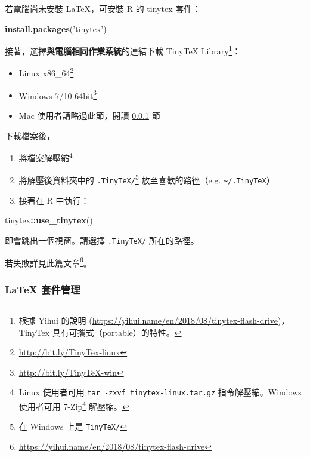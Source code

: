 \documentclass[oneside]{book}
\newenvironment{Shaded}{\begin{snugshade}}{\end{snugshade}}
\newcommand{\KeywordTok}[1]{\textcolor[rgb]{0.13,0.29,0.53}{\textbf{#1}}}
\newcommand{\NormalTok}[1]{#1}
\newcommand{\OperatorTok}[1]{\textcolor[rgb]{0.81,0.36,0.00}{\textbf{#1}}}
\newcommand{\StringTok}[1]{\textcolor[rgb]{0.31,0.60,0.02}{#1}}
\renewcommand{\href}[2]{#2\footnote{\url{#1}}}
\providecommand{\tightlist}{%
  \setlength{\itemsep}{0pt}\setlength{\parskip}{0pt}}
\theoremstyle{definition}
\theoremstyle{definition}
\theoremstyle{definition}
\theoremstyle{remark}
\begin{document}
若電腦尚未安裝 LaTeX，可安裝 R 的 tinytex 套件：

\begin{Shaded}
\begin{Highlighting}[]
\KeywordTok{install.packages}\NormalTok{(}\StringTok{'tinytex'}\NormalTok{)}
\end{Highlighting}
\end{Shaded}

接著，選擇\textbf{與電腦相同作業系統}的連結下載 TinyTeX Library\footnote{根據 Yihui 的說明 (\url{https://yihui.name/en/2018/08/tinytex-flash-drive})，TinyTex 具有可攜式（portable）的特性。}：

\begin{itemize}
\tightlist
\item
  \href{http://bit.ly/TinyTex-linux}{Linux x86\_64}
\item
  \href{http://bit.ly/TinyTeX-win}{Windows 7/10 64bit}
\item
  Mac 使用者請略過此節，閱讀 \ref{tinytex-manage} 節
\end{itemize}

下載檔案後，

\begin{enumerate}
\def\labelenumi{\alph{enumi})}
\item
  將檔案解壓縮\footnote{Linux 使用者可用 \texttt{tar\ -zxvf\ tinytex-linux.tar.gz} 指令解壓縮。Windows 使用者可用 \href{https://www.developershome.com/7-zip/}{7-Zip} 解壓縮。}
\item
  將解壓後資料夾中的 \texttt{.TinyTeX/}\footnote{在 Windows 上是 \texttt{TinyTeX/}} 放至喜歡的路徑（e.g. \texttt{\textasciitilde{}/.TinyTeX}）
\item
  接著在 R 中執行：
\end{enumerate}

\begin{Shaded}
\begin{Highlighting}[]
\NormalTok{tinytex}\OperatorTok{::}\KeywordTok{use_tinytex}\NormalTok{()}
\end{Highlighting}
\end{Shaded}

即會跳出一個視窗。請選擇 \texttt{.TinyTeX/} 所在的路徑。

若失敗詳見\href{https://yihui.name/en/2018/08/tinytex-flash-drive}{此篇文章}。

\hypertarget{tinytex-manage}{%
\subsubsection{LaTeX 套件管理}\label{tinytex-manage}}
\end{document}
